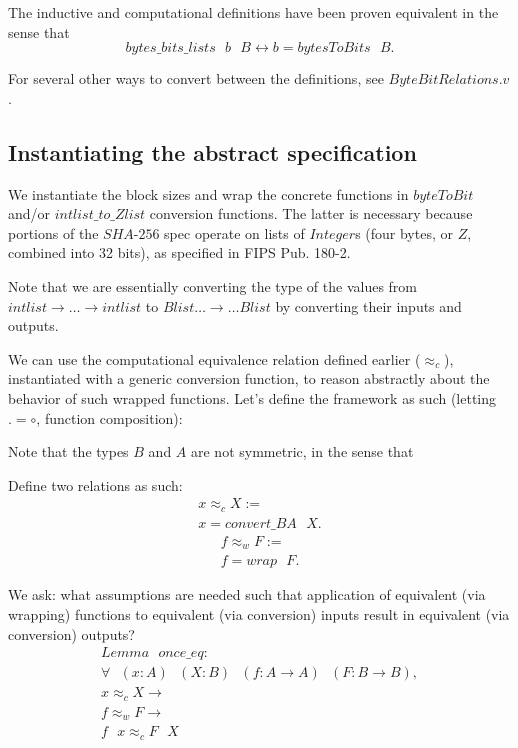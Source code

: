 \documentclass[twocolumn,showpacs,%
  nofootinbib,aps,superscriptaddress,%
  eqsecnum,prd,notitlepage,showkeys,10pt]{revtex4-1}
\newcommand{\eqn}[1] {\begin{gather*}#1\end{gather*}}
\newcommand{\spc} {\textrm{ }}
\begin{document}


The inductive and computational definitions have been proven equivalent in the sense that 
$$bytes\_bits\_lists \textrm{ } b \textrm{ } B \leftrightarrow b = bytesToBits \textrm{ } B.$$

For several other ways to convert between the definitions, see $ByteBitRelations.v$.


\subsection{Instantiating the abstract specification}

We instantiate the block sizes and wrap the concrete functions in $byteToBit$ and/or $intlist\_to\_Zlist$ conversion functions. The latter is necessary because portions of the $SHA$-$256$ spec operate on lists of $Integer$s (four bytes, or $Z$, combined into 32 bits), as specified in FIPS Pub. 180-2.



Note that we are essentially converting the type of the values from $intlist \rightarrow \ldots \rightarrow intlist$ to $Blist \ldots \rightarrow \ldots Blist$ by converting their inputs and outputs.

We can use the computational equivalence relation defined earlier ($\approx_c$), instantiated with a generic conversion function, to reason abstractly about the behavior of such wrapped functions. Let's define the framework as such (letting $. = \circ$, function composition):



Note that the types $B$ and $A$ are not symmetric, in the sense that 

Define two relations as such:
\eqn{
x \approx_c X := \\
x = convert\_BA \textrm{ } X.
}
\eqn{
f \approx_w F := \\
f = wrap \textrm{ } F.
}

We ask: what assumptions are needed such that application of equivalent (via wrapping) functions to equivalent (via conversion) inputs result in equivalent (via conversion) outputs?
\eqn{
Lemma \spc once\_eq : \\
\forall \spc (x : A) \spc (X : B) \spc (f : A \rightarrow A) \spc (F : B \rightarrow B),\\
x \approx_c X \rightarrow \\
f \approx_w F \rightarrow \\
f \spc x \approx_c F \spc X
}
\end{document}
